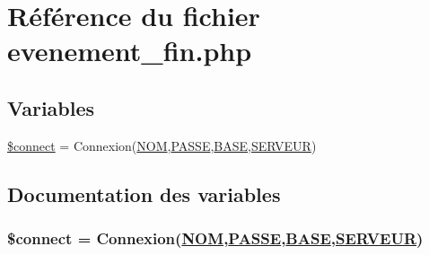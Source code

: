 \hypertarget{evenement__fin_8php}{
\section{R\'{e}f\'{e}rence du fichier evenement\_\-fin.php}
\label{evenement__fin_8php}
}
\subsection*{Variables}
\begin{CompactItemize}
\item 
\hyperlink{evenement__fin_8php_a0}{\$connect} = Connexion(\hyperlink{pma__connect_8php_a0}{NOM},\hyperlink{pma__connect_8php_a1}{PASSE},\hyperlink{pma__connect_8php_a3}{BASE},\hyperlink{pma__connect_8php_a2}{SERVEUR})
\end{CompactItemize}


\subsection{Documentation des variables}
\hypertarget{evenement__fin_8php_a0}{
\subsubsection[\$connect]{\setlength{\rightskip}{0pt plus 5cm}\$connect = Connexion(\hyperlink{pma__connect_8php_a0}{NOM},\hyperlink{pma__connect_8php_a1}{PASSE},\hyperlink{pma__connect_8php_a3}{BASE},\hyperlink{pma__connect_8php_a2}{SERVEUR})}}
\label{evenement__fin_8php_a0}


